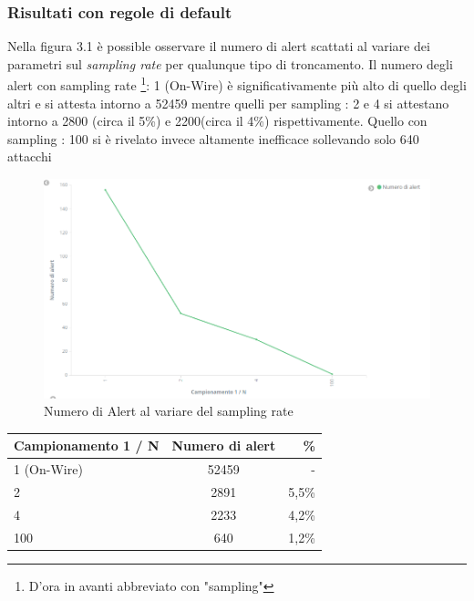 \documentclass[12pt,a4paper,openright,twoside]{report}
\begin{document}
\subsubsection{Risultati con regole di default}

Nella figura 3.1 \`e possible osservare il numero di alert scattati al variare dei
parametri sul {\it sampling rate} per qualunque tipo di troncamento. Il numero degli
alert con sampling rate \footnote{D'ora in avanti abbreviato con "sampling"}: 1 (On-Wire)
\`e significativamente pi\`u alto di quello degli altri e
si attesta intorno a 52459 mentre quelli per sampling : 2 e 4 si attestano intorno a
2800 (circa il 5\%) e 2200(circa il 4\%) rispettivamente. Quello con sampling : 100 si \`e rivelato invece altamente
inefficace sollevando solo 640 attacchi

\begin{figure}[h!]
\begin{center}                          %
  \includegraphics[width=\textwidth]{images/DARPA-sampling-rate.png}
  \caption{Numero di Alert al variare del sampling rate}
  \label{}
\end{center}
\end{figure}
\begin{center}
  \begin{tabular}{| l | c | r |}
    \hline
    {\bf Campionamento 1 / N }& {\bf Numero di alert } & {\bf \% }\\ \hline
    1 (On-Wire) & 52459 & - \\ \hline
    2 & 2891 & 5,5\% \\ \hline
    4 & 2233 & 4,2\% \\ \hline
    100 & 640 & 1,2\% \\ \hline
  \end{tabular}
\end{center}
\end{document}
